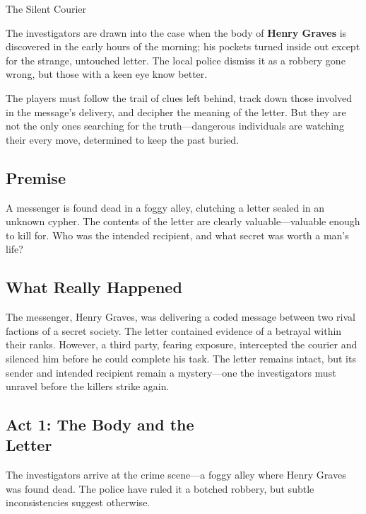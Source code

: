 \begin{WyrdScenarioHeading}{The Silent Courier}

    The investigators are drawn into the case when the body of \textbf{Henry Graves} is discovered in the early hours of the morning; his pockets turned inside out except for the strange, untouched letter. The local police dismiss it as a robbery gone wrong, but those with a keen eye know better.

    The players must follow the trail of clues left behind, track down those involved in the message's delivery, and decipher the meaning of the letter. But they are not the only ones searching for the truth—dangerous individuals are watching their every move, determined to keep the past buried.

    \subsection*{Premise} 
    A messenger is found dead in a foggy alley, clutching a letter sealed in an unknown cypher. The contents of the letter are clearly valuable—valuable enough to kill for. Who was the intended recipient, and what secret was worth a man's life?

    \subsection*{What Really Happened} 
    The messenger, Henry Graves, was delivering a coded message between two rival factions of a secret society. The letter contained evidence of a betrayal within their ranks. However, a third party, fearing exposure, intercepted the courier and silenced him before he could complete his task. The letter remains intact, but its sender and intended recipient remain a mystery—one the investigators must unravel before the killers strike again.
\end{WyrdScenarioHeading}



\subsection{Act 1: The Body and the\\Letter}  
The investigators arrive at the crime scene—a foggy alley where Henry Graves was found dead. The police have ruled it a botched robbery, but subtle inconsistencies suggest otherwise.  

